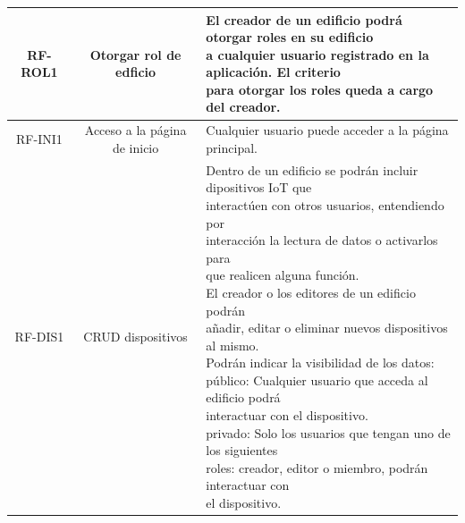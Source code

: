 \documentclass[12pt, a4paper, twoside]{article}
\begin{document}
{\begin{longtable}{ |c|c|l| }
  RF-ROL1 & Otorgar rol de edficio 
  & \makecell[l]{El creador de un edificio podrá otorgar roles en su edificio \\
  a cualquier usuario registrado en la aplicación. El criterio \\
  para otorgar los roles queda a cargo del creador.
  } \\ \hline
 
  RF-INI1 & Acceso a la página de inicio & Cualquier usuario puede acceder a la página principal. \\ \hline
 
  RF-DIS1 & CRUD dispositivos 
  & \makecell[l]{Dentro de un edificio se podrán incluir dipositivos IoT que \\
    interactúen con otros usuarios, entendiendo por\\
    interacción la lectura de datos o activarlos para\\
    que realicen alguna función.\\
    El creador o los editores de un edificio podrán \\ 
    añadir, editar o eliminar nuevos dispositivos al mismo. \\
    Podrán indicar la visibilidad de los datos: \\
    público: Cualquier usuario que acceda al edificio podrá \\
    interactuar con el dispositivo. \\
    privado: Solo los usuarios que tengan uno de los siguientes\\ 
    roles: creador, editor o miembro, podrán interactuar con \\
    el dispositivo.
  } \\ \hline
\end{longtable}
}
\end{document}
